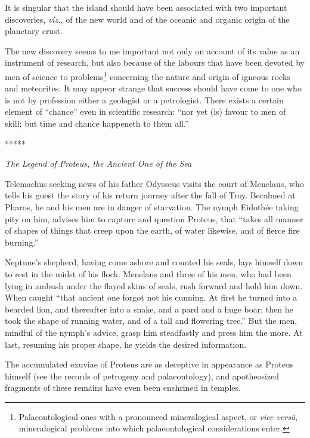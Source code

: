 \documentclass[a4paper, 12pt, oneside, landscape]{article}
\begin{document}
It is singular that the island should have been associated with two important discoveries, \emph{viz.}, of the new world and of the oceanic and organic origin of the planetary crust.

The new discovery seems to me important not only on account of its value as an instrument of research, but also because of the labours that have been devoted by men of science to problems\footnote{Palaeontological ones with a pronounced mineralogical aspect, or \emph{vice versâ}, mineralogical problems into which palaeontological considerations enter.} concerning the nature and origin of igneous rocks and meteorites. It may appear strange that success should have come to one who is not by profession either a geologist or a petrologist. There exists a certain element of ``chance'' even in scientific research: ``nor yet (is) favour to men of skill; but time and chance happeneth to them all.''

\centerline{*\hspace{15mm}*\hspace{15mm}*\hspace{15mm}*\hspace{15mm}*}
\bigskip

\centerline{\emph{The Legend of Proteus, the Ancient One of the Sea}}

Telemachus seeking news of his father Odysseus visits the court of Menelaus, who tells his guest the story of his return journey after the fall of Troy. Becalmed at Pharos, he and his men are in danger of starvation. The nymph Eidothée taking pity on him, advises him to capture and question Proteus, that ``takes all manner of shapes of things that creep upon the earth, of water likewise, and of fierce fire burning.''

Neptune's shepherd, having come ashore and counted his seals, lays himself down to rest in the midst of his flock. Menelaus and three of his men, who had been lying in ambush under the flayed skins of seals, rush forward and hold him down. When caught ``that ancient one forgot not his cunning. At first he turned into a bearded lion, and thereafter into a snake, and a pard and a huge boar; then he took the shape of running water, and of a tall and flowering tree.'' But the men, mindful of the nymph's advice, grasp him steadfastly and press him the more. At last, resuming his proper shape, he yields the desired information.

The accumulated exuviae of Proteus are as deceptive in appearance as Proteus himself (see the records of petrogeny and palaeontology), and apotheosized fragments of these remains have even been enshrined in temples.
\end{document}
